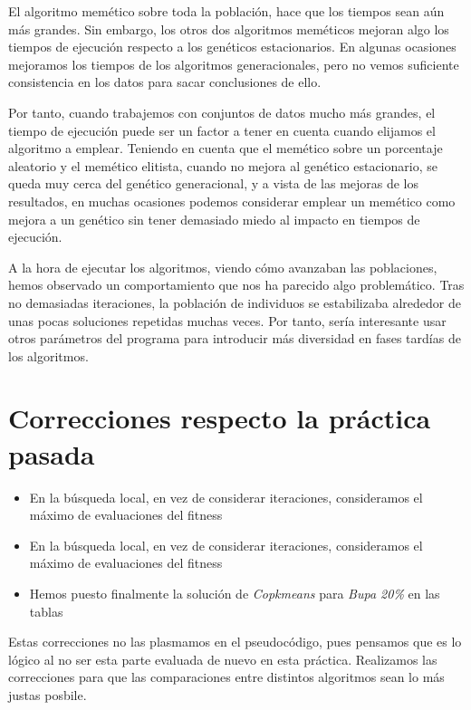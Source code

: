 \documentclass[11pt]{article}
\begin{document}
El algoritmo memético sobre toda la población, hace que los tiempos sean aún más grandes. Sin embargo, los otros dos algoritmos meméticos mejoran algo los tiempos de ejecución respecto a los genéticos estacionarios. En algunas ocasiones mejoramos los tiempos de los algoritmos generacionales, pero no vemos suficiente consistencia en los datos para sacar conclusiones de ello.

Por tanto, cuando trabajemos con conjuntos de datos mucho más grandes, el tiempo de ejecución puede ser un factor a tener en cuenta cuando elijamos el algoritmo a emplear. Teniendo en cuenta que el memético sobre un porcentaje aleatorio y el memético elitista, cuando no mejora al genético estacionario, se queda muy cerca del genético generacional, y a vista de las mejoras de los resultados, en muchas ocasiones podemos considerar emplear un memético como mejora a un genético sin tener demasiado miedo al impacto en tiempos de ejecución.

A la hora de ejecutar los algoritmos, viendo cómo avanzaban las poblaciones, hemos observado un comportamiento que nos ha parecido algo problemático. Tras no demasiadas iteraciones, la población de individuos se estabilizaba alrededor de unas pocas soluciones repetidas muchas veces. Por tanto, sería interesante usar otros parámetros del programa para introducir más diversidad en fases tardías de los algoritmos.

\pagebreak

\section{Correcciones respecto la práctica pasada} \label{seccion:correcciones}

\begin{itemize}
    \item En la búsqueda local, en vez de considerar iteraciones, consideramos el máximo de evaluaciones del fitness
    \item En la búsqueda local, en vez de considerar iteraciones, consideramos el máximo de evaluaciones del fitness
    \item Hemos puesto finalmente la solución de \emph{Copkmeans} para \emph{Bupa 20\%} en las tablas
\end{itemize}

Estas correcciones no las plasmamos en el pseudocódigo, pues pensamos que es lo lógico al no ser esta parte evaluada de nuevo en esta práctica. Realizamos las correcciones para que las comparaciones entre distintos algoritmos sean lo más justas posbile.
\end{document}
